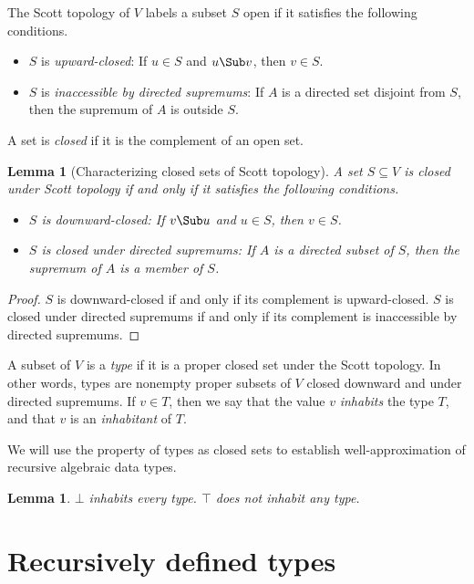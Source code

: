 \documentclass{amsart}
\newtheorem{lemma}[subsection]{Lemma}
\begin{document}
\begin{samepage}
The Scott topology of $V$ labels a subset $S$ open if it
satisfies the following conditions.
\begin{itemize}
\item $S$ is \emph{upward-closed}: If $u\in S$ and $u\Sub v$,
then $v\in S$.
\item $S$ is \emph{inaccessible by directed supremums}: If $A$ is
a directed set disjoint from $S$, then the supremum of $A$ is
outside $S$.
\end{itemize}
\end{samepage}

A set is \emph{closed} if it is the complement of an open set.

\begin{lemma}[Characterizing closed sets of Scott topology]
A set $S\subseteq V$ is closed under Scott topology if and
only if it satisfies the following conditions.
\begin{itemize}
\item $S$ is \emph{downward-closed}: If $v\Sub u$ and $u\in S$,
then $v\in S$.
\item $S$ is \emph{closed under directed supremums}: If
$A$ is a directed subset of $S$, then the supremum of $A$ is a
member of $S$.
\end{itemize}
\end{lemma}

\begin{proof}
$S$ is downward-closed if and only if its complement is
upward-closed. $S$ is closed under directed supremums if and only
if its complement is inaccessible by directed supremums.
\end{proof}


A subset of $V$ is a \emph{type} if it is a proper closed set
under the Scott topology. In other words, types are nonempty
proper subsets of $V$ closed downward and under directed
supremums. If $v\in T$, then we say that the value $v$
\emph{inhabits} the type $T$, and that $v$ is an
\emph{inhabitant} of $T$.

We will use the property of types as closed sets to establish
well-approximation of recursive algebraic data types.

\begin{lemma}
$\bot$ inhabits every type. $\top$ does not inhabit any type.
\end{lemma}

\section{Recursively defined types}
\end{document}
